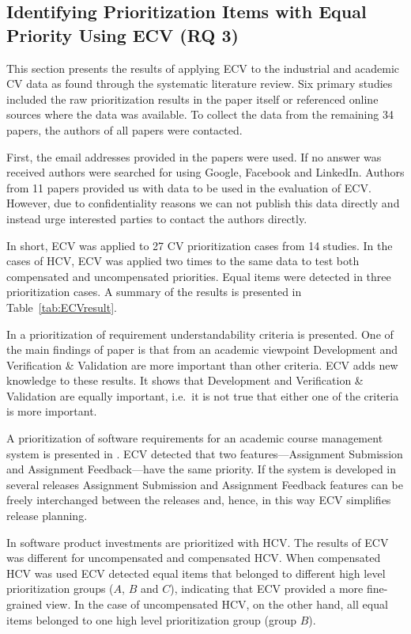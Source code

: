 \subsection{\label{rq3}Identifying Prioritization Items with Equal Priority Using ECV (RQ 3)}
This section presents the results of applying ECV to the industrial and academic CV data as found through the systematic literature review. Six primary studies included the raw prioritization results in the paper itself or referenced online sources where the data was available. To collect the data from the remaining 34 papers, the authors of all papers were contacted.

First, the email addresses provided in the papers were used. If no answer was received authors were searched for using Google, Facebook and LinkedIn. Authors from 11 papers provided us with data to be used in the evaluation of ECV. However, due to confidentiality reasons we can not publish this data directly and instead urge interested parties to contact the authors directly.

In short, ECV was applied to 27 CV prioritization cases from 14 studies.
In the cases of HCV, ECV was applied two times to the same data to test both compensated and uncompensated priorities. Equal items were detected in three prioritization cases. A summary of the results is presented in Table~\ref{tab:ECVresult}.

In \citep{Svahnberg2008} a prioritization of requirement understandability criteria is presented.
One of the main findings of paper \citep{Svahnberg2008} is that from an academic viewpoint Development and Verification & Validation are more important than other criteria.
ECV adds new knowledge to these results.
It shows that Development and Verification & Validation are equally important, i.e.\ it is not true that either one of the criteria is more important.

A prioritization of software requirements for an academic course management system is presented in \citep{Berander2009a}. ECV detected that two features---Assignment Submission and Assignment Feedback---have the same priority.
If the system is developed in several releases Assignment Submission and Assignment Feedback features can be freely interchanged between the releases and, hence, in this way ECV simplifies release planning.

In \citep{Barney2009} software product investments are prioritized with HCV.
The results of ECV was different for uncompensated and compensated HCV.
When compensated HCV was used ECV detected equal items that belonged to different high level prioritization groups ($A$, $B$ and $C$), indicating that ECV provided a more fine-grained view. In the case of uncompensated HCV, on the other hand, all equal items belonged to one high level prioritization group (group $B$).

